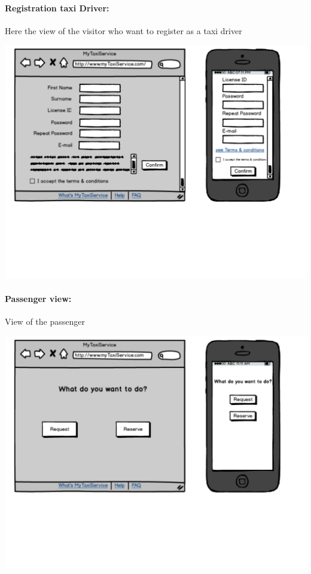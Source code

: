 \paragraph{Registration taxi Driver:}
Here the view of the visitor who want to register as a taxi driver
\begin{center}
	\includegraphics[width=\textwidth]{mockup/registrationTaxiDriver.pdf}
\end{center}

\paragraph{Passenger view:}
View of the passenger
\begin{center}
	\includegraphics[width=\textwidth]{mockup/passengerFunctions.pdf}
\end{center}

